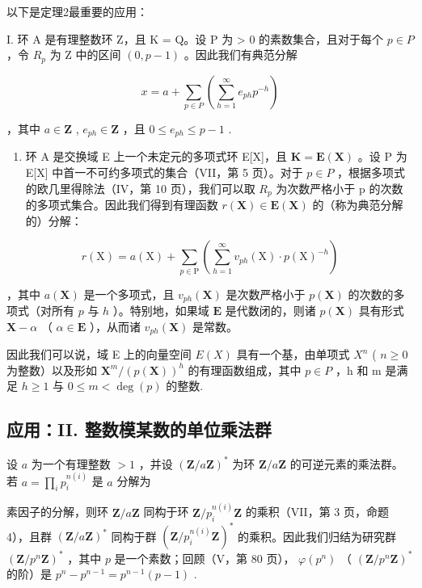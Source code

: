以下是定理2最重要的应用：

I. 环 A 是有理整数环 Z，且 K = Q。设 P 为 \textgreater{} 0 的素数集合，且对于每个 \(p \in P\) ，令 \(R_{p}\) 为 Z 中的区间 \((0, p - 1)\) 。因此我们有典范分解

\[
x = a + \sum_ {p \in P} \left(\sum_ {h = 1} ^ {\infty} e _ {p h} p ^ {- h}\right)
\]

，其中 \(a \in \mathbf{Z}\) , \(e_{ph} \in \mathbf{Z}\) ，且 \(0 \leqslant e_{ph} \leqslant p - 1\) .

\begin{enumerate}
\def\labelenumi{\Roman{enumi}.}
\setcounter{enumi}{1}
\tightlist
\item
  环 A 是交换域 E 上一个未定元的多项式环 E{[}X{]}，且 \(\mathbf{K} = \mathbf{E}(\mathbf{X})\) 。设 P 为 E{[}X{]} 中首一不可约多项式的集合（VII，第 5 页）。对于 \(p \in P\) ，根据多项式的欧几里得除法（IV，第 10 页），我们可以取 \(R_{p}\) 为次数严格小于 p 的次数的多项式集合。因此我们得到有理函数 \(r(\mathbf{X}) \in \mathbf{E}(\mathbf{X})\) 的（称为典范分解的）分解：
\end{enumerate}

\[
r (\mathrm{X}) = a (\mathrm{X}) + \sum_ {p \in \mathrm{P}} \left(\sum_ {h = 1} ^ {\infty} v _ {p h} (\mathrm{X}) \cdot p (\mathrm{X}) ^ {- h}\right)
\]

，其中 \(a(\mathbf{X})\) 是一个多项式，且 \(v_{ph}(\mathbf{X})\) 是次数严格小于 \(p(\mathbf{X})\) 的次数的多项式（对所有 \(p\) 与 \(h\) ）。特别地，如果域 \(\mathbf{E}\) 是代数闭的，则诸 \(p(\mathbf{X})\) 具有形式 \(\mathbf{X} - \alpha\) （ \(\alpha \in \mathbf{E}\) ），从而诸 \(v_{ph}(\mathbf{X})\) 是常数。

因此我们可以说，域 E 上的向量空间 \(E(X)\) 具有一个基，由单项式 \(X^{n}\) ( \(n \geqslant 0\) 为整数）以及形如 \(\mathbf{X}^{m}/(p(\mathbf{X}))^{h}\) 的有理函数组成，其中 \(p \in P\) ，h 和 m 是满足 \(h \geqslant 1\) 与 \(0 \leqslant m < \deg(p)\) 的整数.

\subsection{应用：II. 整数模某数的单位乘法群}

设 \(a\) 为一个有理整数 \(> 1\) ，并设 \((\mathbf{Z} / a\mathbf{Z})^*\) 为环 \(\mathbf{Z} / a\mathbf{Z}\) 的可逆元素的乘法群。若 \(a = \prod_{i} p_i^{n(i)}\) 是 \(a\) 分解为

素因子的分解，则环 \(\mathbf{Z}/a\mathbf{Z}\) 同构于环 \(\mathbf{Z}/p_{i}^{n(i)}\mathbf{Z}\) 的乘积（VII，第 3 页，命题 4），且群 \((\mathbf{Z}/a\mathbf{Z})^{*}\) 同构于群 \((\mathbf{Z}/p_{i}^{n(i)}\mathbf{Z})^{*}\) 的乘积。因此我们归结为研究群 \((\mathbf{Z}/p^{n}\mathbf{Z})^{*}\) ，其中 \(p\) 是一个素数；回顾（V，第 80 页）， \(\varphi(p^{n})\) （ \((\mathbf{Z}/p^{n}\mathbf{Z})^{*}\) 的阶）是 \(p^{n}-p^{n-1}=p^{n-1}(p-1)\) .

